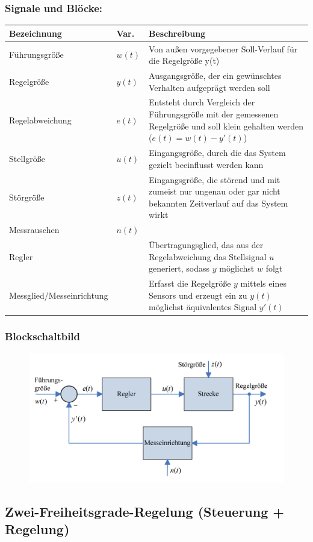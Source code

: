 \documentclass[10pt,a4paper]{article}
\begin{document}
\subsubsection*{Signale und Blöcke:}

\begin{tabularx}{\columnwidth}{llX}
	Bezeichnung & Var. & Beschreibung \\
	\hline
	Führungsgröße & $w(t)$ & Von außen vorgegebener Soll-Verlauf für die Regelgröße y(t) \\
	Regelgröße & $y(t)$ & Ausgangsgröße, der ein gewünschtes Verhalten aufgeprägt werden soll \\
	Regelabweichung & $e(t)$ & Entsteht durch Vergleich der Führungsgröße mit der gemessenen Regelgröße und soll klein gehalten werden ($e(t) = w(t) - y'(t)$) \\
	Stellgröße & $u(t)$ & Eingangsgröße, durch die das System gezielt beeinflusst werden kann \\
	Störgröße & $z(t)$ & Eingangsgröße, die störend und mit zumeist nur ungenau oder gar nicht bekannten Zeitverlauf auf das System wirkt \\
	Messrauschen & $n(t)$ & \\
	Regler && Übertragungsglied, das aus der Regelabweichung das Stellsignal $u$ generiert, sodass $y$ möglichst $w$ folgt \\
	Messglied/Messeinrichtung && Erfasst die Regelgröße $y$ mittels eines Sensors und erzeugt ein zu $y(t)$ möglichst äquivalentes Signal $y'(t)$	
\end{tabularx}

\subsubsection*{Blockschaltbild}
\begin{figure}[H]
	\includegraphics[width=0.8\columnwidth]{imgs/abb1_6.png}
\end{figure}


\subsection{Zwei-Freiheitsgrade-Regelung (Steuerung + Regelung)}
\end{document}
